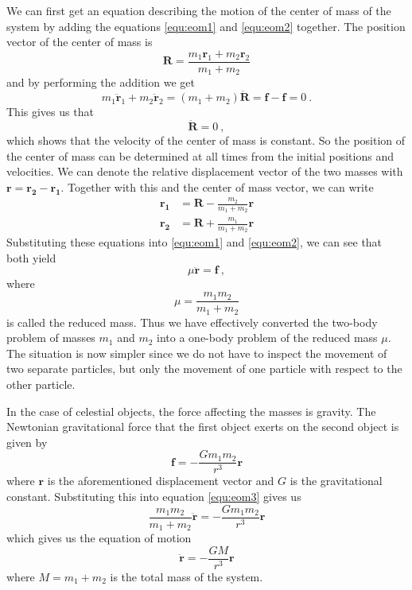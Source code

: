 \documentclass[english, oneside]{HYgradu}
\begin{document}
We can first get an equation describing the motion of the center of mass of the system by adding the equations \eqref{equ:eom1} and \eqref{equ:eom2} together. The position vector of the center of mass is
\begin{equation}
\mathbf{R} = \frac{m_1 \mathbf{r}_1 + m_2 \mathbf{r}_2}{m_1 + m_2}
\end{equation}
and by performing the addition we get
\begin{equation}
m_1 \mathbf{\ddot{r}}_1 + m_2 \mathbf{\ddot{r}}_2 = (m_1 + m_2) \mathbf{\ddot{R}} = \mathbf{f} - \mathbf{f} = 0 \ .
\end{equation}
This gives us that
\begin{equation}
\mathbf{\ddot{R}} = 0 \ ,
\end{equation}
which shows that the velocity of the center of mass is constant. So the position of the center of mass can be determined at all times from the initial positions and velocities. We can denote the relative displacement vector of the two masses with $\mbox{$\mathbf{r} = \mathbf{r_2} - \mathbf{r_1}$}$. Together with this and the center of mass vector, we can write
\begin{align}
\mathbf{r_1} &= \mathbf{R} - \frac{m_2}{m_1 + m_2}\mathbf{r} \\
\mathbf{r_2} &= \mathbf{R} + \frac{m_1}{m_1 + m_2}\mathbf{r}
\end{align}
Substituting these equations into \eqref{equ:eom1} and \eqref{equ:eom2}, we can see that both yield 
\begin{equation}
\mu \mathbf{\ddot{r}} = \mathbf{f} \ , \label{equ:eom3}
\end{equation}
where
\begin{equation}
\mu = \frac{m_1 m_2}{m_1 + m_2}
\end{equation}
is called the reduced mass. Thus we have effectively converted the two-body problem of masses $m_1$ and $m_2$ into a one-body problem of the reduced mass $\mu$. The situation is now simpler since we do not have to inspect the movement of two separate particles, but only the movement of one particle with respect to the other particle.

In the case of celestial objects, the force affecting the masses is gravity. The Newtonian gravitational force that the first object exerts on the second object is given by
\begin{equation}
\mathbf{f} = -\frac{G m_1 m_2}{r^3} \mathbf{r}
\end{equation}
where $\mathbf{r}$ is the aforementioned displacement vector and $G$ is the gravitational constant. Substituting this into equation \eqref{equ:eom3} gives us
\begin{equation}
\frac{m_1 m_2}{m_1 + m_2} \mathbf{\ddot{r}} = -\frac{G m_1 m_2}{r^3} \mathbf{r}
\end{equation}
which gives us the equation of motion
\begin{equation}
\mathbf{\ddot{r}} = -\frac{G M}{r^3} \mathbf{r} \label{equ:eomgravity}
\end{equation}
where $M = m_1 + m_2$ is the total mass of the system.
\end{document}
